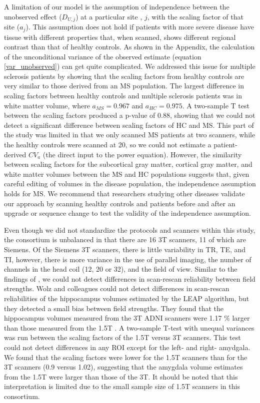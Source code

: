 A limitation of our model is the assumption of independence between the unobserved effect ($D_{U,j}$) at a particular site , $j$, with the scaling factor of that site ($a_j$). This assumption does not hold if patients with more severe disease have tissue with different properties that, when scanned, shows different regional contrast than that of healthy controls. As shown in the Appendix, the calculation of the unconditional variance of the observed estimate (equation \ref{var_unobserved}) can get quite complicated. We addressed this issue for multiple sclerosis patients by showing that the scaling factors from healthy controls are very similar to those derived from an MS population. The largest difference in scaling factors between healthy controls and multiple sclerosis patients was in white matter volume, where $a_{MS} = 0.967$ and $a_{HC} = 0.975$. A two-sample T test between the scaling factors produced a p-value of $0.88$, showing that we could not detect a significant difference between scaling factors of HC and MS. This part of the study was limited in that we only scanned MS patients at two scanners, while the healthy controls were scanned at 20, so we could not estimate a patient-derived $CV_a$ (the direct input to the power equation). However, the similarity between scaling factors for the subcortical gray matter, cortical gray matter, and white matter volumes between the MS and HC populations suggests that, given careful editing of volumes in the disease population, the independence assumption holds for MS. We recommend that researchers studying other diseases validate our approach by scanning healthy controls and patients before and after an upgrade or sequence change to test the validity of the independence assumption.

Even though we did not standardize the protocols and scanners within this study, the consortium is unbalanced in that there are 16 3T scanners, 11 of which are Siemens. Of the Siemens 3T scanners, there is little variability in TR, TE, and TI, however, there is more variance in the use of parallel imaging, the number of channels in the head coil (12, 20 or 32), and the field of view. Similar to the findings of \cite{Jovicich_2009}, we could not detect differences in scan-rescan reliability between field strengths. Wolz and colleagues could not detect differences in scan-rescan reliabilities of the hippocampus volumes estimated by the LEAP algorithm, but they detected a small bias between field strengths. They found that the hippocampus volumes measured from the 3T ADNI scanners were 1.17 \% larger than those measured from the 1.5T \cite{Wolz_2014}. A two-sample T-test with unequal variances was run between the scaling factors of the 1.5T versus 3T scanners. This test could not detect differences in any ROI except for the left- and right- amydgala. We found that the scaling factors were lower for the 1.5T scanners than for the 3T scanners (0.9 versus 1.02), suggesting that the amygdala volume estimates from the 1.5T were larger than those of the 3T. It should be noted that this interpretation is limited due to the small sample size of 1.5T scanners in this consortium.  